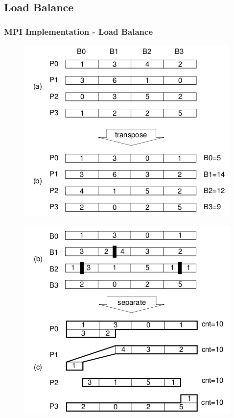 \subsection{Load Balance}

\begin{frame}
	\frametitle{MPI Implementation - Load Balance}

	\begin{minipage}[b]{0.45\linewidth}
		\begin{figure}[!htpb]
			\begin{center}
				\includegraphics[width=\textwidth]{images/mpi}
			\end{center}
		\end{figure}
	\end{minipage}
	\hspace{0.5cm}
	\pause
	\begin{minipage}[b]{0.45\linewidth}
		\begin{figure}[!htpb]
			\begin{center}
				\includegraphics[width=\textwidth]{images/mpi_bal}

\end{center}
\end{figure}
\end{minipage}
\end{frame}
